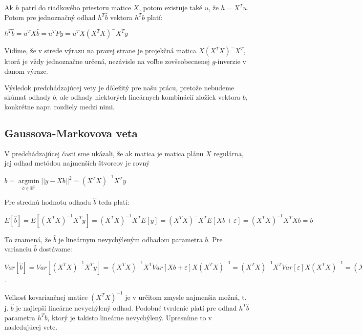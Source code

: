 Ak $h$ patrí do riadkového priestoru matice $X$, potom existuje také $u$, že $h = X^T u$.
Potom pre jednoznačný odhad $h^T \hat{b}$ vektora $h^T b$ platí:

\begin{center}
$h^T \hat{b} = u^T X \hat{b} = u^T P y = u^T X(X^T X)^- X^T y$
\end{center}

Vidíme, že v strede výrazu na pravej strane je projekčná matica $X(X^T X)^- X^T$, ktorá je vždy jednoznačne určená, 
nezávisle na voľbe zovšeobecnenej $g$-inverzie v danom výraze.

Výsledok predchádzajúcej vety je dôležitý pre našu prácu, pretože nebudeme skúmať odhady $b$,
ale odhady niektorých lineárnych kombinácií zložiek vektora $b$, 
konkrétne napr. rozdiely medzi nimi.

\subsection{Gaussova-Markovova veta}

V predchádzajúcej časti sme ukázali, že ak matica je matica plánu $X$ regulárna,
jej odhad metódou najmenších štvorcov je rovný

\begin{center}
$
\hat{b} = \underset{b \in \mathbb{R}^{p}}{\operatorname{arg min}} ||y - Xb||^2 = (X^T X)^{-1} X^T y
$
\end{center}

Pre strednú hodnotu odhadu $\hat{b}$ teda platí:

\begin{center}
$
E[\hat{b}] = E[(X^T X)^{-1} X^T y] = (X^T X)^{-1} X^T E[y] = (X^T X)^- X^T E[Xb + \varepsilon] = (X^T X)^{-1} X^T X b = b
$
\end{center}

To znamená, že $\hat{b}$ je lineárnym nevychýleným odhadom parametra $b$.
Pre varianciu $\hat{b}$ dostávame:

\begin{center}
$
Var[\hat{b}] = Var[(X^T X)^{-1} X^T y] = (X^T X)^{-1} X^T Var[Xb + \varepsilon] X (X^T X)^{-1} =
(X^T X)^{-1} X^T Var[\varepsilon] X (X^T X)^{-1} = (X^T X)^{-1} X^T I X (X^T X)^{-1} = (X^T X)^{-1}
$.
\end{center}

Veľkosť kovariančnej matice $(X^T X)^{-1}$ je v určitom zmysle najmenšia možná, t. j. $\hat{b}$ je najlepší lineárne nevychýlený odhad.
Podobné tvrdenie platí pre odhad $h^T \hat{b}$ parametra $h^T b$, ktorý je takisto lineárne nevychýlený. Upresníme to v nasledujúcej vete.

